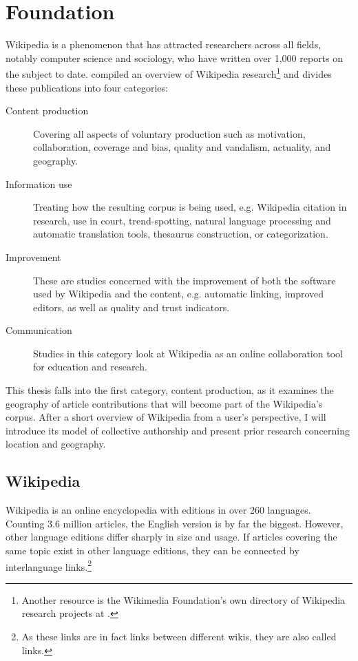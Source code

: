 \chapter{Foundation}\label{ch:foundation}

Wikipedia is a phenomenon that has attracted researchers across all fields, notably computer science and sociology, who have written over 1,000 reports on the subject to date.
\textcite{nielsen2011wikipedia} compiled an overview of Wikipedia research\footnote{Another resource is the Wikimedia Foundation's own directory of Wikipedia research projects at .} and divides these publications into four categories: 
\begin{description}
\item[Content production] Covering all aspects of voluntary production such as motivation, collaboration, coverage and bias, quality and vandalism, actuality, and geography.
\item[Information use] Treating how the resulting corpus is being used, e.g. Wikipedia citation in research, use in court, trend-spotting, natural language processing and automatic translation tools, thesaurus construction, or categorization.
\item[Improvement] These are studies concerned with the improvement of both the software used by Wikipedia and the content, e.g. automatic linking, improved editors, as well as quality and trust indicators. 
\item[Communication] Studies in this category look at Wikipedia as an online collaboration tool for education and research. 
\end{description}

This thesis falls into the first category, content production, as it examines the geography of article contributions that will become part of the Wikipedia's corpus.
After a short overview of Wikipedia from a user's perspective, I will introduce its model of collective authorship and present prior research concerning location and geography. 

\section{Wikipedia}\label{sec:wikipedia}

Wikipedia is an online encyclopedia with editions in over 260 languages.
Counting 3.6 million articles, the English version is by far the biggest.
However, other language editions differ sharply in size and usage.\cite{wikistats}
If articles covering the same topic exist in other language editions, they can be connected by interlanguage links.\footnote{As these links are in fact links between different wikis, they are also called  links.}

